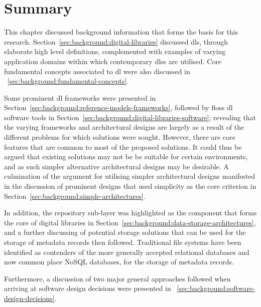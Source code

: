\section{Summary}
\label{sec:background:conclusion}

This chapter discussed background information that forms the basis for this research. Section~\ref{sec:background:digital-libraries} discussed \glspl{dl}, through elaborate high level definitions, complemented with examples of varying application domains within which contemporary \glspl{dls} are utilised. Core fundamental concepts associated to \gls{dl} were also discussed in ~\ref{sec:background:fundamental-concepts}.

Some prominent \gls{dl} frameworks were presented in Section~\ref{sec:background:reference-models-frameworks}, followed by \gls{floss} \gls{dl} software tools in Section~\ref{sec:background:digital-libraries-software}; revealing that the varying frameworks and architectural designs are largely as a result of the different problems for which solutions were sought. However, there are core features that are common to most of the proposed solutions. It could thus be argued that existing solutions may not be be suitable for certain environments, and as such simpler alternative architectural designs may be desirable. A culmination of the argument for utilising simpler architectural designs manifested in the discussion of prominent designs that used simplicity as the core criterion in Section~\ref{sec:background:simple-architectures}. 

In addition, the repository sub-layer was highlighted as the component that forms the core of digital libraries in Section~\ref{sec:background:data-storage-architectures}, and a further discussing of potential storage solutions that can be used for the storage of metadata records then followed. Traditional file systems have been identified as contenders of the more generally accepted relational databases and now common place NoSQL databases, for the storage of metadata records.

Furthermore, a discussion of two major general approaches followed when arriving at software design decisions were presented in ~\ref{sec:background:software-design-decisions}.

